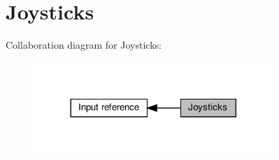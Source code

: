 \hypertarget{group__joysticks}{}\section{Joysticks}
\label{group__joysticks}
Collaboration diagram for Joysticks\+:
\nopagebreak
\begin{figure}[H]
\begin{center}
\leavevmode
\includegraphics[width=257pt]{group__joysticks}
\end{center}
\end{figure}
